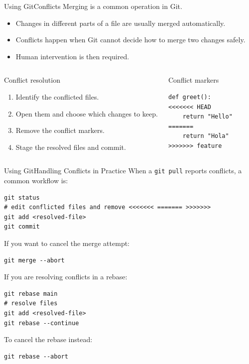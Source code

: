 \documentclass[10pt,compress]{beamer}
\begin{document}
\begin{frame}[fragile]{Using Git}{Conflicts}
Merging is a common operation in Git.

\begin{itemize}
 \item Changes in different parts of a file are usually merged automatically.
 \item Conflicts happen when Git cannot decide how to merge two changes safely.
 \item Human intervention is then required.
\end{itemize}

\begin{columns}
\begin{block}{Conflict resolution}
\begin{enumerate}
 \item Identify the conflicted files.
 \item Open them and choose which changes to keep.
 \item Remove the conflict markers.
 \item Stage the resolved files and commit.
\end{enumerate}
\end{block}

\begin{exampleblock}{Conflict markers}
\begin{lstlisting}[basicstyle=\ttfamily\small]
def greet():
<<<<<<< HEAD
    return "Hello"
=======
    return "Hola"
>>>>>>> feature
\end{lstlisting}
\end{exampleblock}
\end{columns}
\end{frame}

\begin{frame}[fragile]{Using Git}{Handling Conflicts in Practice}
When a \texttt{git pull} reports conflicts, a common workflow is:

\begin{verbatim}
git status
# edit conflicted files and remove <<<<<<< ======= >>>>>>>
git add <resolved-file>
git commit
\end{verbatim}

If you want to cancel the merge attempt:
\begin{verbatim}
git merge --abort
\end{verbatim}

If you are resolving conflicts in a rebase:
\begin{verbatim}
git rebase main
# resolve files
git add <resolved-file>
git rebase --continue
\end{verbatim}
To cancel the rebase instead:
\begin{verbatim}
git rebase --abort
\end{verbatim}
\end{frame}
\end{document}

